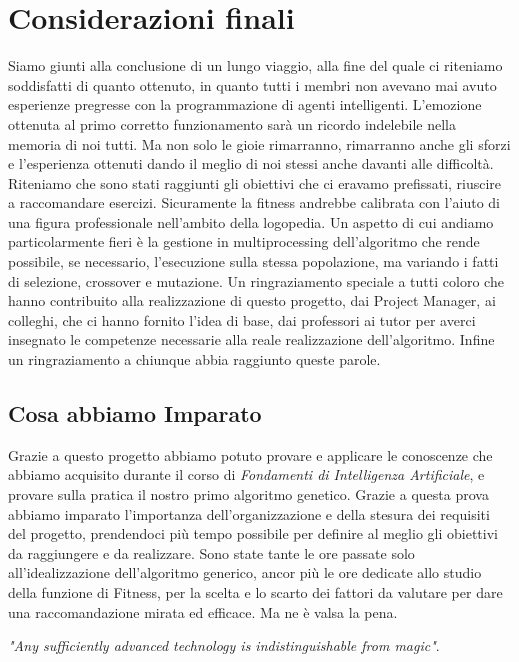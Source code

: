 \documentclass{article}
\begin{document}
\section{Considerazioni finali}
Siamo giunti alla conclusione di un lungo viaggio, alla fine del quale ci riteniamo soddisfatti di quanto ottenuto, in quanto tutti i membri non avevano mai avuto esperienze pregresse con la programmazione di agenti intelligenti. L'emozione ottenuta al primo corretto funzionamento sarà un ricordo indelebile nella memoria di noi tutti. Ma non solo le gioie rimarranno, rimarranno anche gli sforzi e l'esperienza ottenuti dando il meglio di noi stessi anche davanti alle difficoltà. Riteniamo che sono stati raggiunti gli obiettivi che ci eravamo prefissati, riuscire a raccomandare esercizi. Sicuramente la fitness andrebbe calibrata con l'aiuto di una figura professionale nell'ambito della logopedia. Un aspetto di cui andiamo particolarmente fieri è la gestione in multiprocessing dell'algoritmo che rende possibile, se necessario, l'esecuzione sulla stessa popolazione, ma variando i fatti di selezione, crossover e mutazione. Un ringraziamento speciale a tutti coloro che hanno contribuito alla realizzazione di questo progetto, dai Project Manager, ai colleghi, che ci hanno fornito l'idea di base, dai professori ai tutor per averci insegnato le competenze necessarie alla reale realizzazione dell'algoritmo. Infine un ringraziamento a chiunque abbia raggiunto queste parole.

\subsection{Cosa abbiamo Imparato}
Grazie a questo progetto abbiamo potuto provare e applicare le conoscenze che abbiamo acquisito durante il corso di \textit{Fondamenti di
Intelligenza Artificiale}, e provare sulla pratica il nostro primo algoritmo genetico. Grazie a questa prova abbiamo imparato l'importanza dell'organizzazione e della stesura dei requisiti del progetto, prendendoci più tempo possibile per definire al meglio gli obiettivi da raggiungere e da realizzare. Sono state tante le ore passate solo all'idealizzazione dell'algoritmo generico, ancor più le ore dedicate allo studio della funzione di Fitness, per la scelta e lo scarto dei fattori da valutare per dare una raccomandazione mirata ed efficace. Ma ne è valsa la pena. 
\bigskip

\textit{"Any sufficiently advanced technology is indistinguishable from magic"}.
\pagebreak
\end{document}

